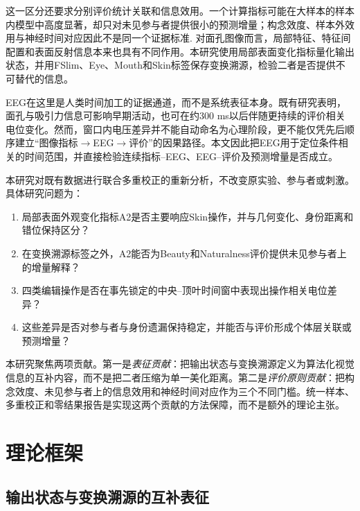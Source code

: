 \documentclass[preprint,12pt,authoryear]{elsarticle}
\begin{document}
这一区分还要求分别评价统计关联和信息效用。一个计算指标可能在大样本的样本内模型中高度显著，却只对未见参与者提供很小的预测增量；构念效度、样本外效用与神经时间对应因此不是同一个证据标准\citep{Shmueli2010,WangStrong1996}. 对面孔图像而言，局部特征、特征间配置和表面反射信息本来也具有不同作用\citep{TanakaFarah1993,Maurer2002,Russell2007,TanakaSimonyi2016}。本研究使用局部表面变化指标量化输出状态，并用FSlim、Eye、Mouth和Skin标签保存变换溯源，检验二者是否提供不可替代的信息。

EEG在这里是人类时间加工的证据通道，而不是系统表征本身。既有研究表明，面孔与吸引力信息可影响早期活动，也可在约300 ms以后伴随更持续的评价相关电位变化\citep{Bentin1996,Schacht2008,ZhangDeng2012,Revers2023}。然而，窗口内电压差异并不能自动命名为心理阶段，更不能仅凭先后顺序建立“图像指标$\rightarrow$EEG$\rightarrow$评价”的因果路径。本文因此把EEG用于定位条件相关的时间范围，并直接检验连续指标--EEG、EEG--评价及预测增量是否成立。

本研究对既有数据进行联合多重校正的重新分析，不改变原实验、参与者或刺激。具体研究问题为：

\begin{enumerate}[label=\textbf{RQ\arabic*.},leftmargin=2.4em]
  \item 局部表面外观变化指标A2是否主要响应Skin操作，并与几何变化、身份距离和错位保持区分？
  \item 在变换溯源标签之外，A2能否为Beauty和Naturalness评价提供未见参与者上的增量解释？
  \item 四类编辑操作是否在事先锁定的中央--顶叶时间窗中表现出操作相关电位差异？
  \item 这些差异是否对参与者与身份遗漏保持稳定，并能否与评价形成个体层关联或预测增量？
\end{enumerate}

本研究聚焦两项贡献。第一是\emph{表征贡献}：把输出状态与变换溯源定义为算法化视觉信息的互补内容，而不是把二者压缩为单一美化距离。第二是\emph{评价原则贡献}：把构念效度、未见参与者上的信息效用和神经时间对应作为三个不同门槛。统一样本、多重校正和零结果报告是实现这两个贡献的方法保障，而不是额外的理论主张。

\section{理论框架}

\subsection{输出状态与变换溯源的互补表征}
\end{document}
